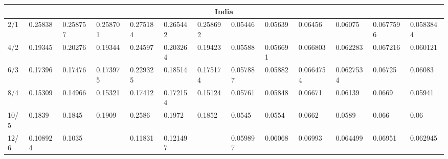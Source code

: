 \begin{landscape}
\begin{table}[]
{\begin{tabular}{@{}lllllllllllll@{}}
\multicolumn{13}{c}{India} \\ \midrule
2/1 & \cellcolor[HTML]{F8A102}0.25838 & \cellcolor[HTML]{F8A102}0.258757 & \cellcolor[HTML]{F8A102}0.258701 & \cellcolor[HTML]{F8A102}0.275184 & \cellcolor[HTML]{F8A102}0.265442 & \cellcolor[HTML]{F8A102}0.258692 & \cellcolor[HTML]{FE0000}0.05446 & \cellcolor[HTML]{FE0000}0.05639 & \cellcolor[HTML]{F8A102}0.06456 & \cellcolor[HTML]{F8A102}0.06075 & \cellcolor[HTML]{F8A102}0.0677596 & \cellcolor[HTML]{F8A102}0.0583844 \\
4/2 & \cellcolor[HTML]{F8A102}0.19345 & \cellcolor[HTML]{F8A102}0.20276 & \cellcolor[HTML]{F8A102}0.19344 & \cellcolor[HTML]{F8A102}0.24597 & \cellcolor[HTML]{F8A102}0.203264 & \cellcolor[HTML]{F8A102}0.19423 & \cellcolor[HTML]{F8A102}0.05588 & \cellcolor[HTML]{F8A102}0.056691 & \cellcolor[HTML]{F8A102}0.066803 & \cellcolor[HTML]{F8A102}0.062283 & \cellcolor[HTML]{F8A102}0.067216 & \cellcolor[HTML]{F8A102}0.060121 \\
6/3 & \cellcolor[HTML]{F8A102}0.17396 & \cellcolor[HTML]{F8A102}0.17476 & \cellcolor[HTML]{F8A102}0.173975 & \cellcolor[HTML]{F8A102}0.229325 & \cellcolor[HTML]{F8A102}0.18514 & \cellcolor[HTML]{F8A102}0.175174 & \cellcolor[HTML]{F8A102}0.057887 & \cellcolor[HTML]{F8A102}0.05882 & \cellcolor[HTML]{F8A102}0.0664754 & \cellcolor[HTML]{F8A102}0.0627534 & \cellcolor[HTML]{F8A102}0.06725 & \cellcolor[HTML]{F8A102}0.06083 \\
8/4 & \cellcolor[HTML]{F8A102}0.15309 & \cellcolor[HTML]{F8A102}0.14966 & \cellcolor[HTML]{F8A102}0.15321 & \cellcolor[HTML]{F8A102}0.17412 & \cellcolor[HTML]{F8A102}0.172154 & \cellcolor[HTML]{F8A102}0.15124 & \cellcolor[HTML]{F8A102}0.05761 & \cellcolor[HTML]{F8A102}0.05848 & \cellcolor[HTML]{F8A102}0.06671 & \cellcolor[HTML]{F8A102}0.06139 & \cellcolor[HTML]{F8A102}0.0669 & \cellcolor[HTML]{F8A102}0.05941 \\
10/5 & \cellcolor[HTML]{F8A102}0.1839 & \cellcolor[HTML]{F8A102}0.1845 & \cellcolor[HTML]{F8A102}0.1909 & \cellcolor[HTML]{F8A102}0.2586 & \cellcolor[HTML]{F8A102}0.1972 & \cellcolor[HTML]{F8A102}0.1852 & \cellcolor[HTML]{F8A102}0.0545 & \cellcolor[HTML]{F8A102}0.0554 & \cellcolor[HTML]{F8A102}0.0662 & \cellcolor[HTML]{F8A102}0.0589 & \cellcolor[HTML]{F8A102}0.066 & \cellcolor[HTML]{F8A102}0.06 \\
12/6 & \cellcolor[HTML]{F8A102}0.108924 & \cellcolor[HTML]{F8A102}0.1035 & \cellcolor[HTML]{F8A102}{\color[HTML]{34FF34} \textbf{0.11205}} & \cellcolor[HTML]{F8A102}0.11831 & \cellcolor[HTML]{F8A102}0.121497 & \cellcolor[HTML]{F8A102}{\color[HTML]{34FF34} \textbf{0.10587}} & \cellcolor[HTML]{F8A102}0.059897 & \cellcolor[HTML]{F8A102}0.06068 & \cellcolor[HTML]{F8A102}0.06993 & \cellcolor[HTML]{F8A102}0.064499 & \cellcolor[HTML]{F8A102}0.06951 & \cellcolor[HTML]{F8A102}0.062945 \\

\end{tabular}}
\end{table}
\end{landscape}
